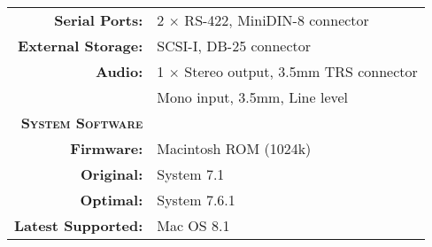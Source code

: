 \begin{tabular}{ r p{6in} }
\\
\textbf{Serial Ports:} & 2 \(\times\) RS-422, MiniDIN-8 connector \\
\textbf{External Storage:} & SCSI-I, DB-25 connector \\
\textbf{Audio:} & 1 \(\times\) Stereo output, 3.5mm TRS connector \\
~ & Mono input, 3.5mm, Line level
\\
\textbf{\textsc{System Software}} & ~ \\
\textbf{Firmware:} & Macintosh ROM (1024k) \\
\textbf{Original:} & System 7.1 \\
\textbf{Optimal:} & System 7.6.1 \\
\textbf{Latest Supported:} & Mac OS 8.1 \\
\end{tabular}
